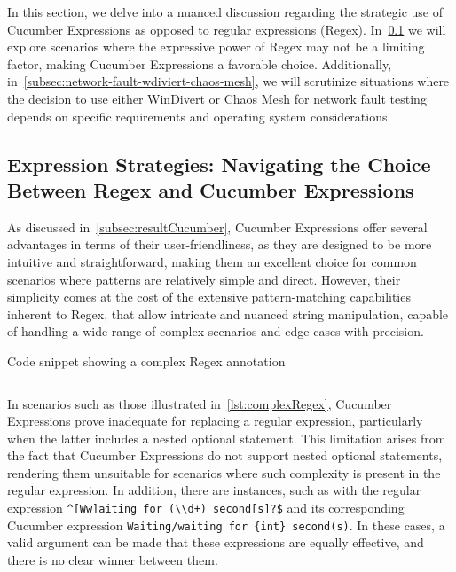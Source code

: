 In this section, we delve into a nuanced discussion regarding the strategic use of Cucumber Expressions as opposed to regular expressions (\ac{Regex}). In~\cref{subsec:expression-strategies} we will explore scenarios where the expressive power of \ac{Regex} may not be a limiting factor, making Cucumber Expressions a favorable choice. Additionally, in~\cref{subsec:network-fault-wdiviert-chaos-mesh}, we will scrutinize situations where the decision to use either WinDivert or Chaos Mesh for network fault testing depends on specific requirements and operating system considerations.

\subsection{Expression Strategies: Navigating the Choice Between \ac{Regex} and Cucumber Expressions}
\label{subsec:expression-strategies}

As discussed in~\cref{subsec:resultCucumber}, Cucumber Expressions offer several advantages in terms of their user-friendliness, as they are designed to be more intuitive and straightforward, making them an excellent choice for common scenarios where patterns are relatively simple and direct. However, their simplicity comes at the cost of the extensive pattern-matching capabilities inherent to \ac{Regex}, that allow intricate and nuanced string manipulation, capable of handling a wide range of complex scenarios and edge cases with precision. 

\begin{listing}[!ht]
\caption{Code snippet showing a complex \ac{Regex} annotation}
\label{lst:complexRegex}
\inputminted{java}{files/code/complexRegex.java}
\end{listing}

In scenarios such as those illustrated in~\cref{lst:complexRegex}, Cucumber Expressions prove inadequate for replacing a regular expression, particularly when the latter includes a nested optional statement. This limitation arises from the fact that Cucumber Expressions do not support nested optional statements, rendering them unsuitable for scenarios where such complexity is present in the regular expression. In addition, there are instances, such as with the regular expression \verb|^[Ww]aiting for (\\d+) second[s]?$| and its corresponding Cucumber expression \verb|Waiting/waiting for {int} second(s)|. In these cases, a valid argument can be made that these expressions are equally effective, and there is no clear winner between them.

